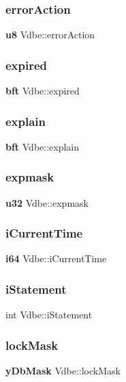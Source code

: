 \subsubsection{errorAction}
{\footnotesize\ttfamily \textbf{ u8} Vdbe\+::error\+Action}

\mbox{\label{struct_vdbe_a1958421b98e6b660a86f58300e2d207d}} 
\subsubsection{expired}
{\footnotesize\ttfamily \textbf{ bft} Vdbe\+::expired}

\mbox{\label{struct_vdbe_a9ea665c14b97cccb7ce08c129f5b38b6}} 
\subsubsection{explain}
{\footnotesize\ttfamily \textbf{ bft} Vdbe\+::explain}

\mbox{\label{struct_vdbe_a5e22eedb6ee963a0bcf27fc9fd8b8e43}} 
\subsubsection{expmask}
{\footnotesize\ttfamily \textbf{ u32} Vdbe\+::expmask}

\mbox{\label{struct_vdbe_acae77663d67978b91566ced549035f03}} 
\subsubsection{iCurrentTime}
{\footnotesize\ttfamily \textbf{ i64} Vdbe\+::i\+Current\+Time}

\mbox{\label{struct_vdbe_ae2b5893f3d37e004acac58bffee1a229}} 
\subsubsection{iStatement}
{\footnotesize\ttfamily int Vdbe\+::i\+Statement}

\mbox{\label{struct_vdbe_a7de4b1df727c3d2d32778a77f5c5dd68}} 
\subsubsection{lockMask}
{\footnotesize\ttfamily \textbf{ y\+Db\+Mask} Vdbe\+::lock\+Mask}

